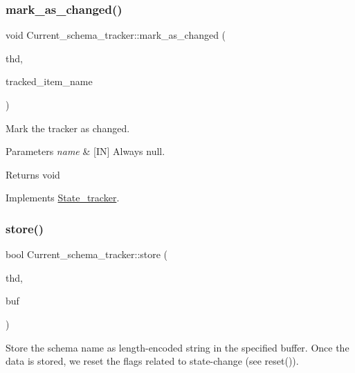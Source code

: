 \subsubsection{\texorpdfstring{mark\+\_\+as\+\_\+changed()}{mark\_as\_changed()}}
{\footnotesize\ttfamily void Current\+\_\+schema\+\_\+tracker\+::mark\+\_\+as\+\_\+changed (\begin{DoxyParamCaption}\item[{T\+HD $\ast$}]{thd,  }\item[{L\+E\+X\+\_\+\+C\+S\+T\+R\+I\+NG $\ast$}]{tracked\+\_\+item\+\_\+name }\end{DoxyParamCaption})\hspace{0.3cm}{\ttfamily [virtual]}}



Mark the tracker as changed. 


\begin{DoxyParams}{Parameters}
{\em name} & \mbox{[}IN\mbox{]} Always null.\\
\hline
\end{DoxyParams}
\begin{DoxyReturn}{Returns}
void 
\end{DoxyReturn}


Implements \mbox{\hyperlink{classState__tracker_afb865d3837c0f8fc9cd36d5234142b32}{State\+\_\+tracker}}.

\mbox{\label{classCurrent__schema__tracker_a9d33638a5c4db24bb480f9aa0e202edb}} 
\subsubsection{\texorpdfstring{store()}{store()}}
{\footnotesize\ttfamily bool Current\+\_\+schema\+\_\+tracker\+::store (\begin{DoxyParamCaption}\item[{T\+HD $\ast$}]{thd,  }\item[{String \&}]{buf }\end{DoxyParamCaption})\hspace{0.3cm}{\ttfamily [virtual]}}



Store the schema name as length-\/encoded string in the specified buffer. Once the data is stored, we reset the flags related to state-\/change (see reset()). 



